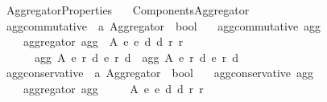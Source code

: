 %
\begin{isabellebody}%
%
%
\isadelimtheory
%
\endisadelimtheory
%
\isatagtheory
{}\isamarkupfalse%
\ Aggregator{\isacharunderscore}{\kern0pt}Properties\isanewline
\ \ \ {\isachardoublequoteopen}{\isachardot}{\kern0pt}{\isachardot}{\kern0pt}{\isacharslash}{\kern0pt}Components{\isacharslash}{\kern0pt}Aggregator{\isachardoublequoteclose}\isanewline
\isanewline
{}%
\endisatagtheory
{\isafoldtheory}%
%
\isadelimtheory
\isanewline
%
\endisadelimtheory
\isanewline
{}\isamarkupfalse%
\ agg{\isacharunderscore}{\kern0pt}commutative\ {\isacharcolon}{\kern0pt}{\isacharcolon}{\kern0pt}\ {\isachardoublequoteopen}{\isacharprime}{\kern0pt}a\ Aggregator\ {\isasymRightarrow}\ bool{\isachardoublequoteclose}\ \isanewline
\ \ {\isachardoublequoteopen}agg{\isacharunderscore}{\kern0pt}commutative\ agg\ {\isasymequiv}\isanewline
\ \ \ \ aggregator\ agg\ {\isasymand}\ {\isacharparenleft}{\kern0pt}{\isasymforall}A\ e{}\ e{}\ d{}\ d{}\ r{}\ r{}{\isachardot}{\kern0pt}\isanewline
\ \ \ \ \ \ agg\ A\ {\isacharparenleft}{\kern0pt}e{}{\isacharcomma}{\kern0pt}\ r{}{\isacharcomma}{\kern0pt}\ d{}{\isacharparenright}{\kern0pt}\ {\isacharparenleft}{\kern0pt}e{}{\isacharcomma}{\kern0pt}\ r{}{\isacharcomma}{\kern0pt}\ d{}{\isacharparenright}{\kern0pt}\ {\isacharequal}{\kern0pt}\ agg\ A\ {\isacharparenleft}{\kern0pt}e{}{\isacharcomma}{\kern0pt}\ r{}{\isacharcomma}{\kern0pt}\ d{}{\isacharparenright}{\kern0pt}\ {\isacharparenleft}{\kern0pt}e{}{\isacharcomma}{\kern0pt}\ r{}{\isacharcomma}{\kern0pt}\ d{}{\isacharparenright}{\kern0pt}{\isacharparenright}{\kern0pt}{\isachardoublequoteclose}\isanewline
\isanewline
{}\isamarkupfalse%
\ agg{\isacharunderscore}{\kern0pt}conservative\ {\isacharcolon}{\kern0pt}{\isacharcolon}{\kern0pt}\ {\isachardoublequoteopen}{\isacharprime}{\kern0pt}a\ Aggregator\ {\isasymRightarrow}\ bool{\isachardoublequoteclose}\ \isanewline
\ \ {\isachardoublequoteopen}agg{\isacharunderscore}{\kern0pt}conservative\ agg\ {\isasymequiv}\isanewline
\ \ \ \ aggregator\ agg\ {\isasymand}\isanewline
\ \ \ \ {\isacharparenleft}{\kern0pt}{\isasymforall}A\ e{}\ e{}\ d{}\ d{}\ r{}\ r{}{\isachardot}{\kern0pt}\isanewline

\end{isabellebody}
